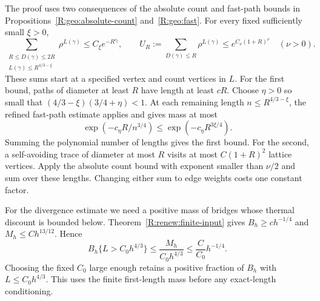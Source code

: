 The proof uses two consequences of the absolute count and fast-path bounds in Propositions~\ref{R:geo:absolute-count} and~\ref{R:geo:fast}. For every fixed sufficiently small $\xi>0$,
\begin{equation}
 \sum_{\substack{R\le D(\gamma)\le2R\\ L(\gamma)\le R^{4/3-\xi}}}
       \rho^{L(\gamma)}\le C_\xi e^{-R^{c_\xi}},
 \qquad
 U_R:=\sum_{D(\gamma)\le R}\rho^{L(\gamma)}
       \le e^{C_\nu(1+R)^\nu}\quad(\nu>0).
 \label{R:resp:critical-inputs}
\end{equation}
These sums start at a specified vertex and count vertices in $L$. For the first bound, paths of diameter at least $R$ have length at least $cR$. Choose $\eta>0$ so small that $(4/3-\xi)(3/4+\eta)<1$. At each remaining length $n\le R^{4/3-\xi}$, the refined fast-path estimate applies and gives mass at most
\[
 \exp(-c_\eta R/n^{3/4})\le\exp(-c_\eta R^{3\xi/4}).
\]
Summing the polynomial number of lengths gives the first bound. For the second, a self-avoiding trace of diameter at most $R$ visits at most $C(1+R)^2$ lattice vertices. Apply the absolute count bound with exponent smaller than $\nu/2$ and sum over these lengths. Changing either sum to edge weights costs one constant factor.

For the divergence estimate we need a positive mass of bridges whose thermal discount is bounded below. Theorem~\ref{R:renew:finite-input} gives $B_h\ge ch^{-1/4}$ and $M_h\le Ch^{13/12}$. Hence
\[
 B_h\{L>C_0h^{4/3}\}\le \frac{M_h}{C_0h^{4/3}}
       \le \frac C{C_0}h^{-1/4}.
\]
Choosing the fixed $C_0$ large enough retains a positive fraction of $B_h$ with $L\le C_0h^{4/3}$. This uses the finite first-length mass before any exact-length conditioning.

